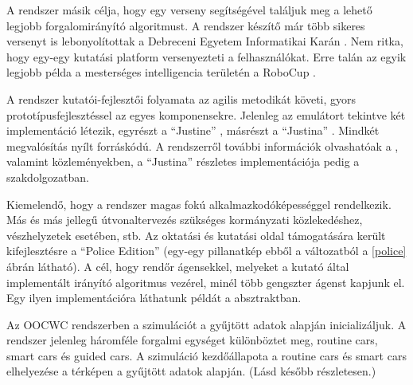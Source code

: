 \documentclass[a4paper,12pt]{report}
\begin{document}
A rendszer másik célja, hogy egy verseny segítségével találjuk meg a lehető legjobb forgalomirányító algoritmust. A rendszer készítő már több sikeres versenyt is lebonyolítottak a Debreceni Egyetem Informatikai Karán \cite{competitions}. Nem ritka, hogy egy-egy kutatási platform versenyezteti a felhasználókat. Erre talán az egyik legjobb példa a mesterséges intelligencia területén a RoboCup \cite{robocup}. 

A rendszer kutatói-fejlesztői folyamata az agilis metodikát követi, gyors prototípusfejlesztéssel az egyes komponensekre. Jelenleg az emulátort tekintve két implementáció létezik, egyrészt a ``Justine'' \cite{oocwcrepo} , másrészt a ``Justina'' \cite{justinarepo}. Mindkét megvalósítás nyílt forráskódú. A rendszerről további információk olvashatóak a \cite{7231223}, valamint \cite{infocomjournal} közleményekben, a ``Justina'' részletes implementációja pedig a \cite{mamenyak2015robotauto} szakdolgozatban.

Kiemelendő, hogy a rendszer magas fokú alkalmazkodóképességgel rendelkezik. Más és más jellegű útvonaltervezés szükséges kormányzati közlekedéshez, vészhelyzetek esetében, stb. Az oktatási és kutatási oldal támogatására került kifejlesztésre a ``Police Edition'' (egy-egy pillanatkép ebből a változatból a \ref{police} ábrán látható). A cél, hogy rendőr ágensekkel, melyeket a kutató által implementált irányító algoritmus vezérel, minél több gengszter ágenst kapjunk el. Egy ilyen implementációra láthatunk példát a \cite{forkcoginfocom} absztraktban.

Az OOCWC rendszerben a szimulációt a gyűjtött adatok alapján inicializáljuk. A rendszer jelenleg háromféle forgalmi egységet különböztet meg, routine cars, smart cars és guided cars. A szimuláció kezdőállapota a routine cars és smart cars elhelyezése a térképen a gyűjtött adatok alapján. (Lásd később részletesen.)
\end{document}
